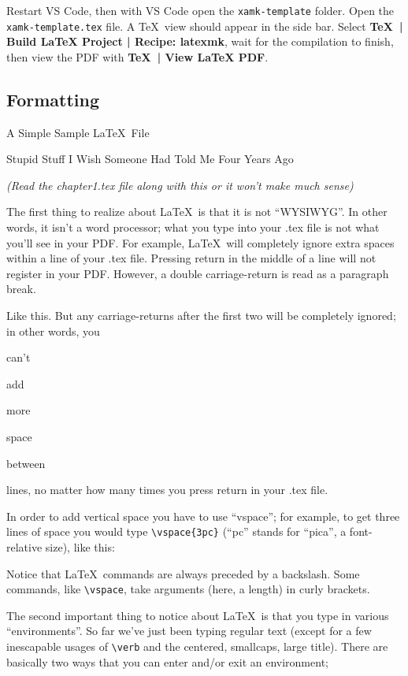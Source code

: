 Restart VS Code, then with VS Code open the \texttt{xamk-template} folder.
Open the \texttt{xamk-template.tex} file.
A \TeX\ view should appear in the side bar.
Select \textbf{\TeX\ | Build LaTeX Project | Recipe: latexmk}, wait for the compilation to finish, then view the PDF with \textbf{\TeX\ | View LaTeX PDF}.

\subsection{Formatting}

{\centering\sc \large A Simple Sample \LaTeX\ File \parencite{formatting}\par}
\centerline{\sc Stupid Stuff I Wish Someone Had Told Me Four Years Ago}
\centerline{\it (Read the chapter1.tex file along with this or it won't make much sense)}

The first thing to realize about \LaTeX\ is that it is not ``WYSIWYG''.
In other words, it isn't a word processor; what you type into your .tex file is not what you'll see in your PDF.
For example, \LaTeX\ will      completely     ignore               extra    spaces    within                             a line of your .tex file.
Pressing return
in
the
middle
of
a
line
will not register in your PDF.
However, a double carriage-return is read as a paragraph break.

Like this.
But any carriage-returns after the first two will be completely ignored; in other words, you


can't

add






more




space


between




lines, no matter how many times you press return in your .tex file.

In order to add vertical space you have to use ``vspace''; for example, to get three lines of space you would type \verb|\vspace{3pc}| (``pc'' stands for ``pica'', a font-relative size), like this:
\vspace{3pc}

Notice that \LaTeX\ commands are always preceded by a backslash.
Some commands, like \verb|\vspace|, take arguments (here, a length) in curly brackets.

The second important thing to notice about \LaTeX\ is that you type in various ``environments''.
So far we've just been typing regular text (except for a few inescapable usages of \verb|\verb| and the centered, smallcaps, large title).
There are basically two ways that you can enter and/or exit an environment;
\vspace{0pc}

